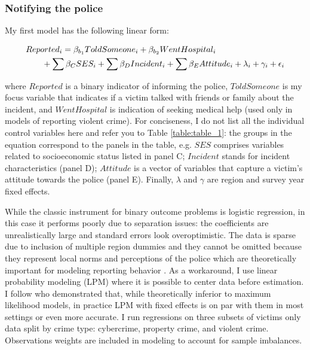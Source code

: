\documentclass[]{interact}
\theoremstyle{plain}%
\theoremstyle{definition}
\theoremstyle{remark}
\newcommand\citep{\parencite}
\newcommand\citet{\textcite}
\begin{document}
	\subsubsection*{Notifying the police}
	
	My first model has the following linear form:
	
	\begin{equation}
		\begin{multlined}[0.9\linewidth]
			\label{eq:1}
			\small
			Reported_i = \beta_{b_1} ToldSomeone_i + \beta_{b_2} WentHospital_i 
			\\ + \sum \beta_C SES_i + \sum \beta_D Incident_i + \sum \beta_E Attitude_i + \lambda_i + \gamma_i + \epsilon_i
		\end{multlined}
	\end{equation}

	where $Reported$ is a binary indicator of informing the police, $ToldSomeone$ is my focus variable that indicates if a victim talked with friends or family about the incident, and $WentHospital$ is indication of seeking medical help (used only in models of reporting violent crime). For conciseness, I do not list all the individual control variables here and refer you to Table \ref{table:table_1}: the groups in the equation correspond to the panels in the table, e.g. $SES$ comprises variables related to socioeconomic status listed in panel C; $Incident$ stands for incident characteristics (panel D); $Attitude$ is a vector of variables that capture a victim's attitude towards the police (panel E). Finally, $\lambda$ and $\gamma$ are region and survey year fixed effects.
	
	While the classic instrument for binary outcome problems is logistic regression, in this case it performs poorly due to separation issues: the coefficients are unrealistically large and standard errors look overoptimistic. The data is sparse due to inclusion of multiple region dummies and they cannot be omitted because they represent local norms and perceptions of the police which are theoretically  important for modeling reporting behavior \citep{goudriaan2004reporting, boateng2018crime, ann2010neighborhood}. As a workaround, I use linear probability modeling (LPM) where it is possible to center data before estimation. I follow \citet{timoneda2021estimating} who demonstrated that, while theoretically inferior to maximum likelihood models, in practice LPM with fixed effects is on par with them in most settings or even more accurate. I run regressions on three subsets of victims only data split by crime type: cybercrime, property crime, and violent crime. Observations weights are included in modeling to account for sample imbalances.%
	
\end{document}
